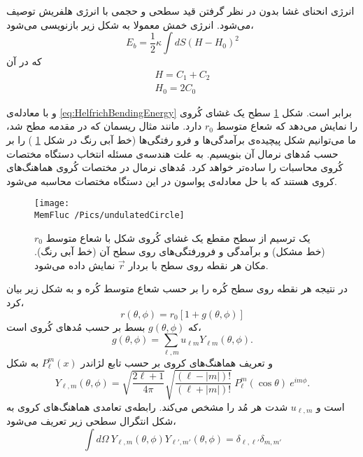 \setRL


انرژی انحنای غشا بدون در نظر گرفتن قید سطحی و حجمی با انرژی هلفریش 
\cite{Helfrich1973}
توصیف می‌شود. انرژی خمش معمولا به شکل زیر بازنویسی می‌شود،
\begin{equation}
E_{b}=\frac{1}{2}\kappa\int dS\left(H-H_0\right)^2
\label{eq:HelfrichBendingEnergyH}
\end{equation}
که در آن
\begin{equation}
\begin{aligned}
H=C_1+C_2\\
H_0=2C_0
\end{aligned}
\end{equation}

و با معادله‌ی 
\ref{eq:HelfrichBendingEnergy}
برابر است. شکل
\ref{fig:undulatedCircle}
سطح یک غشای کُروی را نمایش می‌دهد که شعاع متوسط 
$r_0$
دارد. مانند مثال ریسمان که در مقدمه مطح شد، ما می‌توانیم شکل پیچیده‌ی برآمدگی‌ها و فرو رفتگی‌ها (خط آبی رنگ در شکل 
\ref{fig:undulatedCircle}
) را بر حسب مُد‌های نرمال آن بنویسیم. به علت هندسه‌ی مسئله انتخاب دستگاه مختصات کُروی محاسبات را ساده‌تر خواهد کرد. مُد‌های نرمال در مختصات کُروی هماهنگ‌های کروی
هستند که با حل معادله‌ی پواسون در این دستگاه مختصات محاسبه می‌شود. 
\begin{figure}[h]
\begin{center}
\texttt{[image: \\MemFluc /Pics/undulatedCircle]}
\caption{
یک ترسیم از سطح مقطع یک غشای کُروی شکل با شعاع متوسط 
$r_0$
(خط مشکل) و برآمدگی و فرورفتگی‌های روی سطح آن (خط آبی رنگ). مکان هر نقطه روی سطح با بردار 
$\vec r$
نمایش داده می‌شود.
}
\label{fig:undulatedCircle}
\end{center}
\end{figure}
در نتیجه هر نقطه روی سطح کُره را بر حسب شعاع متوسط کُره و به شکل زیر بیان کرد،
\begin{equation}
r(\theta,\phi)=r_0\left[1+g(\theta,\phi)\right]
\end{equation}
که 
$g(\theta,\phi)$
بسط بر حسب مُدهای کُروی است،
\begin{equation}
g(\theta,\phi)=\sum_{\ell,m}u_{\ell m}Y_{\ell m} (\theta,\phi).
\label{eq:gdef}
\end{equation}
و تعریف هماهنگ‌های کروی بر حسب تابع لژاندر
$P_\ell^m(x)$
به شکل
\begin{equation}
Y_{\ell,m}(\theta,\phi)=\sqrt{\frac{2\ell+1}{4\pi}}\sqrt{\frac{(\ell-|m|)!}{(\ell+|m|)!}}~P_\ell^m(\cos\theta)~e^{im\phi}.
\label{eq:rYlmLogandre}
\end{equation}
است و 
$u_{\ell,m}$
شدت هر مُد را مشخص می‌کند. رابطه‌ی تعامدی هماهنگ‌های کروی به شکل انتگرال سطحی زیر تعریف می‌شود،
\begin{equation}
\int d\Omega~Y_{\ell,m}(\theta,\phi)Y_{\ell',m'}(\theta,\phi)=\delta_{\ell,\ell'}\delta_{m,m'}
\label{eq:rYlmOrthonormal}
\end{equation}


